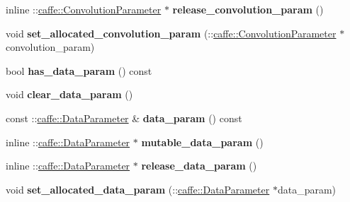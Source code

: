 \begin{DoxyCompactItemize}
inline \+::\mbox{\hyperlink{classcaffe_1_1_convolution_parameter}{caffe\+::\+Convolution\+Parameter}} $\ast$ {\bfseries release\+\_\+convolution\+\_\+param} ()
\item 
\mbox{\label{classcaffe_1_1_v1_layer_parameter_a55a4f4cd626a7cd0f615e0a423371e1b}} 
void {\bfseries set\+\_\+allocated\+\_\+convolution\+\_\+param} (\+::\mbox{\hyperlink{classcaffe_1_1_convolution_parameter}{caffe\+::\+Convolution\+Parameter}} $\ast$convolution\+\_\+param)
\item 
\mbox{\label{classcaffe_1_1_v1_layer_parameter_ab4fcc396257b33b95744c641e9523970}} 
bool {\bfseries has\+\_\+data\+\_\+param} () const
\item 
\mbox{\label{classcaffe_1_1_v1_layer_parameter_a8ee663211d7923e69feef156c2712aa1}} 
void {\bfseries clear\+\_\+data\+\_\+param} ()
\item 
\mbox{\label{classcaffe_1_1_v1_layer_parameter_abc8aecc752b7fe7f9d87336aa5e169ad}} 
const \+::\mbox{\hyperlink{classcaffe_1_1_data_parameter}{caffe\+::\+Data\+Parameter}} \& {\bfseries data\+\_\+param} () const
\item 
\mbox{\label{classcaffe_1_1_v1_layer_parameter_aa6bb4d7325c8bfcfff1f6b959ddb8a08}} 
inline \+::\mbox{\hyperlink{classcaffe_1_1_data_parameter}{caffe\+::\+Data\+Parameter}} $\ast$ {\bfseries mutable\+\_\+data\+\_\+param} ()
\item 
\mbox{\label{classcaffe_1_1_v1_layer_parameter_a2b3567df2436243c30eec4ae11ca872c}} 
inline \+::\mbox{\hyperlink{classcaffe_1_1_data_parameter}{caffe\+::\+Data\+Parameter}} $\ast$ {\bfseries release\+\_\+data\+\_\+param} ()
\item 
\mbox{\label{classcaffe_1_1_v1_layer_parameter_a29e4348178e803babbb55ef1d9cc3bcf}} 
void {\bfseries set\+\_\+allocated\+\_\+data\+\_\+param} (\+::\mbox{\hyperlink{classcaffe_1_1_data_parameter}{caffe\+::\+Data\+Parameter}} $\ast$data\+\_\+param)
\item 
\mbox{\label{classcaffe_1_1_v1_layer_parameter_a9619bff45d433930260ed5c853be23f5}} 

\end{DoxyCompactItemize}
